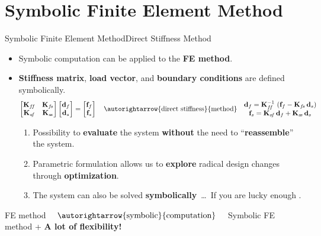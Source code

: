\section{Symbolic Finite Element Method}

\begin{frame}{Symbolic Finite Element Method}{Direct Stiffness Method}
  \begin{itemize}
    \item Symbolic computation can be applied to the \textbf{\ac{FE} method}.
    \item \textbf{Stiffness matrix}, \textbf{load vector}, and \textbf{boundary conditions} are defined symbolically.
    \begin{equation*}
      \begin{bmatrix}
        \mathbf{K}_{f\!f} & \mathbf{K}_{f\!s} \\
        \mathbf{K}_{s\!f} & \mathbf{K}_{s\!s}
      \end{bmatrix} \begin{bmatrix}
        \mathbf{d}_{f} \\
        \mathbf{d}_{s}
      \end{bmatrix} = \begin{bmatrix}
        \mathbf{f}_{f} \\
        \mathbf{f}_{s}
      \end{bmatrix}
      \quad \autorightarrow{\text{direct stiffness}}{\text{method}} \quad
      \begin{matrix}
        \mathbf{d}_{f} = \mathbf{K}_{f\!f}^{-1}\,\left(\mathbf{f}_{f} - \mathbf{K}_{f\!s}\,\mathbf{d}_{s}\right) \\
        \mathbf{f}_{s} = \mathbf{K}_{s\!f}\,\mathbf{d}_{f} + \mathbf{K}_{s\!s}\,\mathbf{d}_{s}
      \end{matrix}
    \end{equation*}
    \begin{enumerate}
      \item Possibility to \textbf{evaluate} the system \textbf{without} the need to ``\textbf{reassemble}'' the system. \\
      \item Parametric formulation allows us to \textbf{explore} radical design changes through \textbf{optimization}. \\
      \item The system can also be solved \textbf{symbolically}~\dots~If you are lucky enough \raisebox{-3.5pt}{\huge\trollface{}}.
    \end{enumerate}
  \end{itemize}
  \begin{bbox}
    \centering
    \ac{FE} method $\quad \autorightarrow{\text{symbolic}}{\text{computation}} \quad$ Symbolic \ac{FE} method + \textcolor{fg_sl_color}{\textbf{A lot of flexibility!}}
  \end{bbox}
\end{frame}


